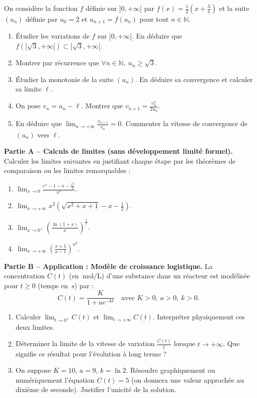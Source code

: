 \documentclass[11pt]{article}
\begin{document}
\begin{exercice}
On considère la fonction $f$ définie sur $]0, +\infty[$ par $f(x) = \frac{1}{2}\left(x + \frac{3}{x}\right)$ et la suite $(u_n)$ définie par $u_0 = 2$ et $u_{n+1} = f(u_n)$ pour tout $n \in \mathbb{N}$.
\begin{enumerate}
    \item Étudier les variations de $f$ sur $]0, +\infty[$. En déduire que $f([\sqrt{3}, +\infty[) \subset [\sqrt{3}, +\infty[$.
    \item Montrer par récurrence que $\forall n \in \mathbb{N},\ u_n \ge \sqrt{3}$.
    \item Étudier la monotonie de la suite $(u_n)$. En déduire sa convergence et calculer sa limite $\ell$.
    \item On pose $v_n = u_n - \ell$. Montrer que $v_{n+1} = \frac{v_n^2}{2u_n}$.
    \item En déduire que $\displaystyle \lim_{n\to +\infty} \frac{v_{n+1}}{v_n} = 0$. Commenter la vitesse de convergence de $(u_n)$ vers $\ell$.
\end{enumerate}
\end{exercice}

\begin{exercice}
\textbf{Partie A -- Calculs de limites (sans développement limité formel).}
Calculer les limites suivantes en justifiant chaque étape par les théorèmes de comparaison ou les limites remarquables :
\begin{enumerate}
    \item $\displaystyle \lim_{x\to 0} \frac{e^x - 1 - x - \frac{x^2}{2}}{x^3}$.
    \item $\displaystyle \lim_{x\to +\infty} x^2 \left( \sqrt{x^2+x+1} - x - \frac{1}{2} \right)$.
    \item $\displaystyle \lim_{x\to 0^+} \left( \frac{\ln(1+x)}{x} \right)^{\frac{1}{x}}$.
    \item $\displaystyle \lim_{x\to +\infty} \left( \frac{x+1}{x-1} \right)^{x^2}$.
\end{enumerate}

\textbf{Partie B -- Application : Modèle de croissance logistique.}
La concentration $C(t)$ (en $\SI{}{\mole\per\liter}$) d'une substance dans un réacteur est modélisée pour $t \ge 0$ (temps en $\SI{}{\second}$) par :
\[
C(t) = \frac{K}{1 + a e^{-kt}} \quad \text{avec } K>0,\ a>0,\ k>0.
\]
\begin{enumerate}
    \item Calculer $\lim_{t\to 0^+} C(t)$ et $\lim_{t\to +\infty} C(t)$. Interpréter physiquement ces deux limites.
    \item Déterminer la limite de la vitesse de variation $\frac{C(t)}{t}$ lorsque $t \to +\infty$. Que signifie ce résultat pour l'évolution à long terme ?
    \item On suppose $K=10$, $a=9$, $k=\ln 2$. Résoudre graphiquement ou numériquement l'équation $C(t) = 5$ (on donnera une valeur approchée au dixième de seconde). Justifier l'unicité de la solution.
\end{enumerate}
\end{exercice}
\end{document}
